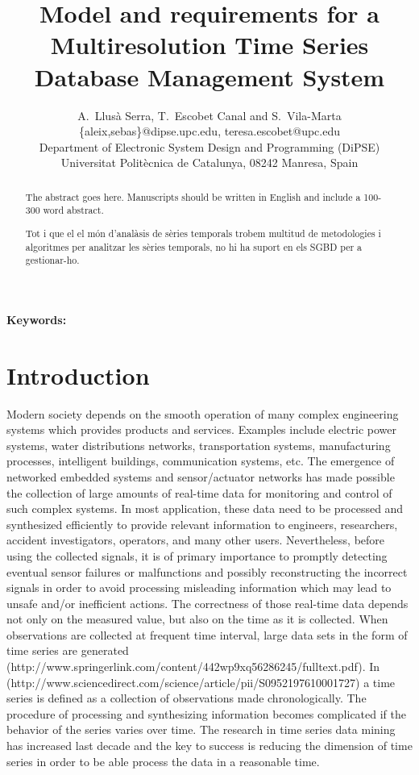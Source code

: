 \documentclass{scrartcl}
\title{
  Model and requirements for a Multiresolution Time Series
  Database Management System }
\author
{
  {
    A.\ Llusà Serra,
    T.\ Escobet Canal
    and S.\ Vila-Marta
  }\\
  {\{aleix,sebas\}@dipse.upc.edu, teresa.escobet@upc.edu}\\
  {Department of Electronic System Design and Programming (DiPSE)}\\
  {Universitat Politècnica de Catalunya, 08242 Manresa, Spain}
}
\begin{document}
\maketitle


\begin{abstract}
The abstract goes here.
Manuscripts should be written in English and include a 100-300 word abstract.

Tot i que el el món d'analàsis de sèries temporals trobem multitud de metodologies i algoritmes per analitzar les sèries temporals, no hi ha suport en els SGBD per a gestionar-ho.
\end{abstract}

{\bfseries Keywords:} 







\section{Introduction}



Modern society depends on the smooth operation of many complex engineering systems which provides products and services. Examples include electric power systems, water distributions networks, transportation systems, manufacturing processes, intelligent buildings, communication systems, etc. The emergence of networked embedded systems and sensor/actuator networks has made possible the collection of large amounts of real-time data for monitoring and control of such complex systems.  In most application, these data need to be processed and synthesized efficiently to provide relevant information to engineers, researchers, accident investigators, operators, and many other users. Nevertheless, before using the collected signals, it is of primary importance to promptly detecting eventual sensor failures or malfunctions and possibly reconstructing the incorrect signals in order to avoid processing misleading information which may lead to unsafe and/or inefficient actions. The correctness of those real-time data depends not only on the measured value, but also on the time as it is collected. When observations are collected at frequent time interval, large data sets in the form of time series are generated (http://www.springerlink.com/content/442wp9xq56286245/fulltext.pdf). In (http://www.sciencedirect.com/science/article/pii/S0952197610001727) a time series is defined as a collection of observations made chronologically. The procedure of processing and synthesizing information becomes complicated if the behavior of the series varies over time.  The research in time series data mining has increased last decade and the key to success is reducing the dimension of time series in order to be able process the data in a reasonable time.
\end{document}
